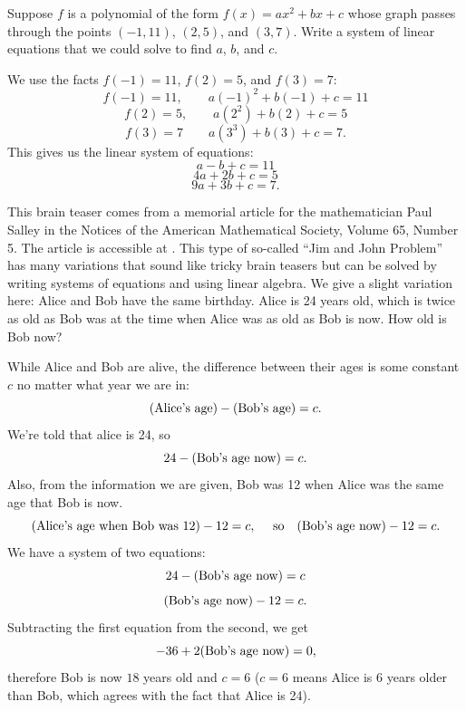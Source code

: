 \begin{problems}
\problem %
Suppose $f$ is a polynomial of the form $f(x) = ax^2+bx+c$
whose graph passes through the points $(-1, 11)$, $(2, 5)$, and
$(3, 7)$.  Write a system of linear equations that we could solve to
find $a$, $b$, and $c$.

\begin{solution}
  We use the facts $f(-1)=11$, $f(2) = 5$, and $f(3) = 7$:
  \[f(-1) = 11, \qquad a(-1)^2 + b(-1) + c = 11\]
  \[f(2) = 5, \qquad a(2^2) + b(2) + c = 5\]
  \[f(3) = 7 \qquad a(3^3) + b(3) + c = 7.\] This gives us the linear
  system of equations:
  \[a - b + c = 11\]
  \[4a + 2b + c = 5\]
  \[9a + 3b + c = 7.\]
\end{solution}

\problem %
This brain teaser comes from a memorial article for the mathematician
Paul Salley in the Notices of the American Mathematical Society,
Volume 65, Number 5.  The article is accessible at
{}.  %
This type of so-called ``Jim and John Problem'' has many variations
that sound like tricky brain teasers but can be solved by writing
systems of equations and using linear algebra.  We give a slight
variation here: \newline \newline Alice and Bob have the same
birthday.  Alice is 24 years old, which is twice as old as Bob was at
the time when Alice was as old as Bob is now.  How old is Bob now?

\begin{solution}
  While Alice and Bob are alive, the difference between their ages is
  some constant $c$ no matter what year we are in:
  \[(\textup{Alice's age}) - (\textup{Bob's age}) = c.\]
  We're told that alice is 24, so
  \[24-(\textup{Bob's age now}) = c.\]
  Also, from the information we are given, Bob was 12 when Alice was the same
  age that Bob is now.
  \[(\textup{Alice's age when Bob was 12}) - 12 = c,
    \quad \textup{ so} \quad (\textup{Bob's age now})-12 = c.\]
  We have a system of two equations: 
  \[24-(\textup{Bob's age now}) = c\]
  \[(\textup{Bob's age now}) - 12 = c.\]
  Subtracting the first equation from the second, we get
  \[-36 + 2(\textup{Bob's age now}) = 0,\] therefore Bob is now $18$ years
  old and $c = 6$ ($c=6$ means Alice is $6$ years older than Bob, which
  agrees with the fact that Alice is 24).
\end{solution}





\end{problems}
